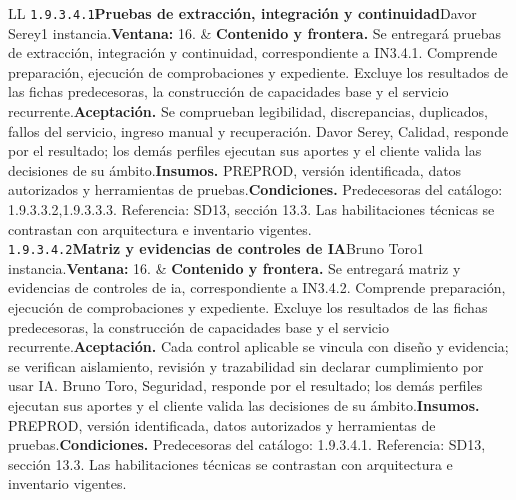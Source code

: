 \begin{longtable}{L{\tabcolsep\relax}L{\tabcolsep\relax}}
\texttt{1.\allowbreak{}9.\allowbreak{}3.\allowbreak{}4.\allowbreak{}1}\newline{}\textbf{Pruebas de extracción, integración y continuidad}\newline{}Davor Serey\newline{}1 instancia.\newline{}\textbf{Ventana:} 16. & \textbf{Contenido y frontera.} Se entregará pruebas de extracción, integración y continuidad, correspondiente a IN3.4.1. Comprende preparación, ejecución de comprobaciones y expediente. Excluye los resultados de las fichas predecesoras, la construcción de capacidades base y el servicio recurrente.\newline{}\textbf{Aceptación.} Se comprueban legibilidad, discrepancias, duplicados, fallos del servicio, ingreso manual y recuperación. Davor Serey, Calidad, responde por el resultado; los demás perfiles ejecutan sus aportes y el cliente valida las decisiones de su ámbito.\newline{}\textbf{Insumos.} PREPROD, versión identificada, datos autorizados y herramientas de pruebas.\newline{}\textbf{Condiciones.} Predecesoras del catálogo: 1.9.3.3.2,1.9.3.3.3. Referencia: SD13, sección 13.3. Las habilitaciones técnicas se contrastan con arquitectura e inventario vigentes.\\\hline
\texttt{1.\allowbreak{}9.\allowbreak{}3.\allowbreak{}4.\allowbreak{}2}\newline{}\textbf{Matriz y evidencias de controles de IA}\newline{}Bruno Toro\newline{}1 instancia.\newline{}\textbf{Ventana:} 16. & \textbf{Contenido y frontera.} Se entregará matriz y evidencias de controles de ia, correspondiente a IN3.4.2. Comprende preparación, ejecución de comprobaciones y expediente. Excluye los resultados de las fichas predecesoras, la construcción de capacidades base y el servicio recurrente.\newline{}\textbf{Aceptación.} Cada control aplicable se vincula con diseño y evidencia; se verifican aislamiento, revisión y trazabilidad sin declarar cumplimiento por usar IA. Bruno Toro, Seguridad, responde por el resultado; los demás perfiles ejecutan sus aportes y el cliente valida las decisiones de su ámbito.\newline{}\textbf{Insumos.} PREPROD, versión identificada, datos autorizados y herramientas de pruebas.\newline{}\textbf{Condiciones.} Predecesoras del catálogo: 1.9.3.4.1. Referencia: SD13, sección 13.3. Las habilitaciones técnicas se contrastan con arquitectura e inventario vigentes.\\\hline

\end{longtable}
